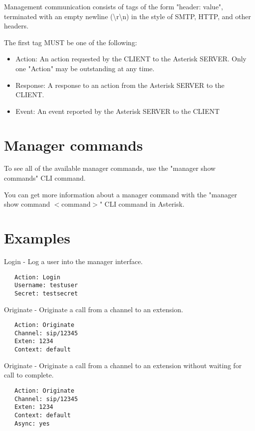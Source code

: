 Management communication consists of tags of the form "header: value",
terminated with an empty newline (\textbackslash r\textbackslash n) in 
the style of SMTP, HTTP, and other headers.

The first tag MUST be one of the following:

\begin{itemize}
    \item Action: An action requested by the CLIENT to the Asterisk SERVER. 
        Only one "Action" may be outstanding at any time.
    \item Response: A response to an action from the Asterisk SERVER to the CLIENT.
    \item Event: An event reported by the Asterisk SERVER to the CLIENT
\end{itemize}

\section{Manager commands}

To see all of the available manager commands, use the "manager show commands"
CLI command.

You can get more information about a manager command
with the "manager show command $<$command$>$" CLI command in Asterisk.

\section{Examples}

Login - Log a user into the manager interface.

\begin{verbatim}
   Action: Login
   Username: testuser
   Secret: testsecret
\end{verbatim}

Originate - Originate a call from a channel to an extension.

\begin{verbatim}
   Action: Originate
   Channel: sip/12345
   Exten: 1234
   Context: default
\end{verbatim}

Originate - Originate a call from a channel to an extension without waiting
for call to complete.

\begin{verbatim}
   Action: Originate
   Channel: sip/12345
   Exten: 1234
   Context: default
   Async: yes
\end{verbatim}

